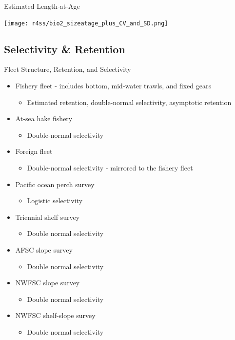 \documentclass[pdf]{beamer}\usepackage[]{graphicx}\usepackage[]{color}
\begin{document}
\begin{frame}{Estimated Length-at-Age}
  \begin{center}
    \texttt{[image: r4ss/bio2\_sizeatage\_plus\_CV\_and\_SD.png]}
  \end{center}
\end{frame}


\subsection{Selectivity \& Retention}  
\begin{frame}{Fleet Structure, Retention, and Selectivity}
  \begin{itemize}
    \item Fishery fleet - includes bottom, mid-water trawls, and fixed gears
      \begin{itemize}
        \item Estimated retention, double-normal selectivity, asymptotic retention
      \end{itemize}
    \item At-sea hake fishery
      \begin{itemize}
        \item Double-normal selectivity
      \end{itemize}
    \item Foreign fleet
      \begin{itemize}
        \item Double-normal selectivity - mirrored to the fishery fleet
      \end{itemize}
    \item Pacific ocean perch survey
      \begin{itemize}
        \item Logistic selectivity 
      \end{itemize}
    \item Triennial shelf survey
      \begin{itemize}
        \item Double normal selectivity 
      \end{itemize}
    \item AFSC slope survey
        \begin{itemize}
        \item Double normal selectivity 
      \end{itemize}
    \item NWFSC slope survey
      \begin{itemize}
        \item Double normal selectivity 
      \end{itemize}
    \item NWFSC shelf-slope survey
      \begin{itemize}
        \item Double normal selectivity 
      \end{itemize}
  \end{itemize}
\end{frame}
\end{document}
